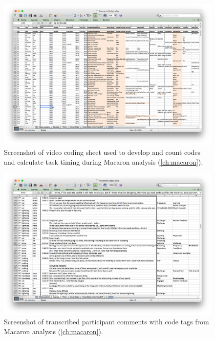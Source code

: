 	\begin{figure}[htbp] %
	   \centering
	   \includegraphics[width=\textwidth]{Chapter99-SupportingMaterials/MethodExamples/MacaronCoding} 
	   \caption{Screenshot of video coding sheet used to develop and count codes and calculate task timing during Macaron analysis (\autoref{ch:macaron}).}
	   \label{fig:SupportingMaterials:MethodExamples:MacaronCoding}
	\end{figure}


	\begin{figure}[htbp] %
	   \centering
	   \includegraphics[width=\textwidth]{Chapter99-SupportingMaterials/MethodExamples/MacaronQuotes} 
	   \caption{Screenshot of transcribed participant comments with code tags from Macaron analysis (\autoref{ch:macaron}).}
	   \label{fig:SupportingMaterials:MethodExamples:MacaronQuotes}
	\end{figure}


